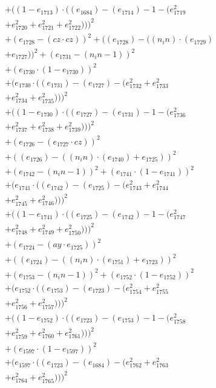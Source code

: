 \documentclass[10pt, a4paper]{article}
\begin{document}
\begin{align*}
& + ((1 - e_{1713})  \cdot  ((e_{1684}) - (e_{1714}) - 1 - (e_{1719}^{2} \\
& + e_{1720}^{2} + e_{1721}^{2} + e_{1722}^{2})))^{2} \\
& + (e_{1728} - (cz  \cdot  cz))^{2} + ((e_{1728}) - ((n_in)  \cdot  (e_{1729}) \\
& + e_{1727}))^{2} + (e_{1731} - (n_in - 1))^{2} \\
& + (e_{1730}  \cdot  (1 - e_{1730}))^{2} \\
& + (e_{1730}  \cdot  ((e_{1731}) - (e_{1727}) - (e_{1732}^{2} + e_{1733}^{2} \\
& + e_{1734}^{2} + e_{1735}^{2})))^{2} \\
& + ((1 - e_{1730})  \cdot  ((e_{1727}) - (e_{1731}) - 1 - (e_{1736}^{2} \\
& + e_{1737}^{2} + e_{1738}^{2} + e_{1739}^{2})))^{2} \\
& + (e_{1726} - (e_{1727}  \cdot  cz))^{2} \\
& + ((e_{1726}) - ((n_in)  \cdot  (e_{1740}) + e_{1725}))^{2} \\
& + (e_{1742} - (n_in - 1))^{2} + (e_{1741}  \cdot  (1 - e_{1741}))^{2} \\
& + (e_{1741}  \cdot  ((e_{1742}) - (e_{1725}) - (e_{1743}^{2} + e_{1744}^{2} \\
& + e_{1745}^{2} + e_{1746}^{2})))^{2} \\
& + ((1 - e_{1741})  \cdot  ((e_{1725}) - (e_{1742}) - 1 - (e_{1747}^{2} \\
& + e_{1748}^{2} + e_{1749}^{2} + e_{1750}^{2})))^{2} \\
& + (e_{1724} - (ay  \cdot  e_{1725}))^{2} \\
& + ((e_{1724}) - ((n_in)  \cdot  (e_{1751}) + e_{1723}))^{2} \\
& + (e_{1753} - (n_in - 1))^{2} + (e_{1752}  \cdot  (1 - e_{1752}))^{2} \\
& + (e_{1752}  \cdot  ((e_{1753}) - (e_{1723}) - (e_{1754}^{2} + e_{1755}^{2} \\
& + e_{1756}^{2} + e_{1757}^{2})))^{2} \\
& + ((1 - e_{1752})  \cdot  ((e_{1723}) - (e_{1753}) - 1 - (e_{1758}^{2} \\
& + e_{1759}^{2} + e_{1760}^{2} + e_{1761}^{2})))^{2} \\
& + (e_{1597}  \cdot  (1 - e_{1597}))^{2} \\
& + (e_{1597}  \cdot  ((e_{1723}) - (e_{1684}) - (e_{1762}^{2} + e_{1763}^{2} \\
& + e_{1764}^{2} + e_{1765}^{2})))^{2} \\

\end{align*}
\end{document}
